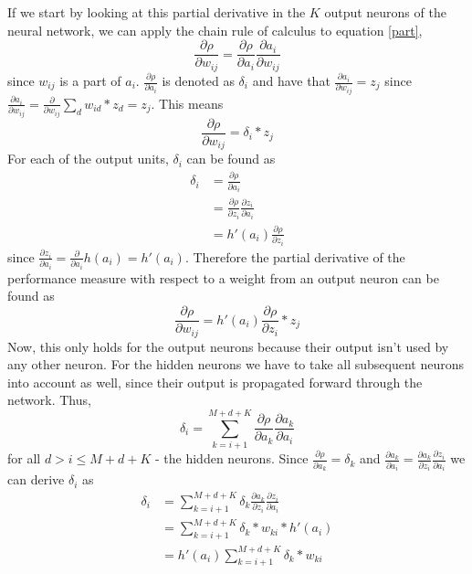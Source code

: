 \documentclass[11pt]{article}
\begin{document}
If we start by looking at this partial derivative in the $K$ output neurons of the
neural network, we can apply the chain rule of calculus to equation \ref{part},
\begin{equation}
    \frac{\partial \rho}{\partial w_{ij}} = \frac{\partial \rho}{\partial a_i} \frac{\partial a_i}{\partial w_{ij}} 
\end{equation}
since $w_{ij}$ is a part of $a_i$.
$\frac{\partial \rho}{\partial a_i}$ is denoted as $\delta_i$ and have that $\frac{\partial a_i}{\partial w_{ij}} = z_j$ since
$\frac{\partial a_i}{\partial w_{ij}} = \frac{\partial}{\partial w_{ij}} \sum_{d} w_{id} * z_d = z_j$.
This means
\begin{equation}\label{eq:der}
    \frac{\partial \rho}{\partial w_{ij}} = \delta_i * z_j  
\end{equation}
For each of the output units, $\delta_i$ can be found as
\begin{equation}
    \begin{aligned}
        \delta_i & = \frac{\partial \rho}{\partial a_i}\\
        & = \frac{\partial \rho}{\partial z_i} \frac{\partial z_i}{\partial a_i}\\
        & = h'(a_i) \frac{\partial \rho}{\partial z_i} 
    \end{aligned}
\end{equation}
since $\frac{\partial z_i}{\partial a_i} =  \frac{\partial}{\partial a_i} h(a_i) = h'(a_i)$.
Therefore the partial derivative of the performance measure with respect to a weight from
an output neuron can be found as
\begin{equation}
    \frac{\partial \rho}{\partial w_{ij}} = h'(a_i) \frac{\partial \rho}{\partial z_i} * z_j
\end{equation}
Now, this only holds for the output neurons because their output isn't
used by any other neuron.
For the hidden neurons we have to take all subsequent neurons into account as
well, since their output is propagated forward through the network.
Thus,
\begin{equation}
    \delta_i = \sum\limits_{k=i+1}^{M + d + K} \frac{\partial \rho}{\partial a_k} \frac{\partial a_k}{\partial a_i} 
\end{equation}
for all $d > i \leq M + d + K$ - the hidden neurons.
Since $\frac{\partial \rho}{\partial a_k} = \delta_k$ and
$\frac{\partial a_k}{\partial a_i} = \frac{\partial a_k}{\partial z_i} \frac{\partial z_i}{\partial a_i}$ we
can derive $\delta_i$ as
\begin{equation}
    \begin{aligned}
        \delta_i & = \sum\limits_{k=i+1}^{M + d + K} \delta_k \frac{\partial a_k}{\partial z_i} \frac{\partial z_i}{\partial a_i}\\
        & = \sum\limits_{k=i+1}^{M + d + K} \delta_k * w_{ki} *  h'(a_i)\\
        & = h'(a_i) \sum\limits_{k=i+1}^{M + d + K} \delta_k * w_{ki}
    \end{aligned}
\end{equation}
\end{document}
